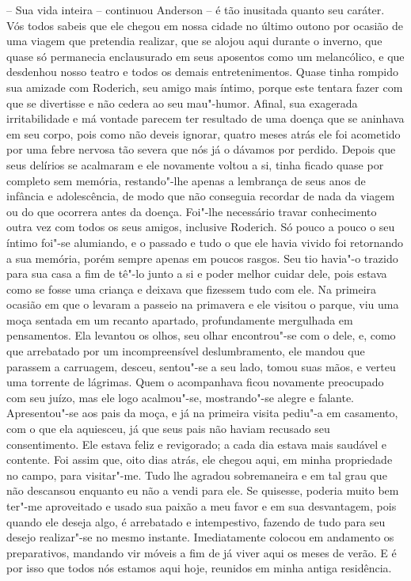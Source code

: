-- Sua vida inteira -- continuou Anderson -- é tão inusitada quanto seu
caráter. Vós todos sabeis que ele chegou em nossa cidade no último
outono por ocasião de uma viagem que pretendia realizar, que se alojou
aqui durante o inverno, que quase só permanecia enclausurado em seus
aposentos como um melancólico, e que desdenhou nosso teatro e todos os
demais entretenimentos. Quase tinha rompido sua amizade com Roderich,
seu amigo mais íntimo, porque este tentara fazer com que se divertisse
e não cedera ao seu mau"-humor. Afinal, sua exagerada irritabilidade e
má vontade parecem ter resultado de uma doença que se aninhava em seu corpo,
pois como não deveis ignorar, quatro meses atrás ele foi acometido
por uma febre nervosa tão severa que nós já o dávamos por perdido.
Depois que seus delírios se acalmaram e ele novamente voltou a si,
tinha ficado quase por completo sem memória, restando"-lhe apenas a
lembrança de seus anos de infância e adolescência, de modo que não
conseguia recordar de nada da viagem ou do que ocorrera antes da
doença. Foi"-lhe necessário travar conhecimento outra vez com todos os
seus amigos, inclusive Roderich. Só pouco a pouco o seu íntimo foi"-se
alumiando, e o passado e tudo o que ele havia vivido foi retornando a
sua memória, porém sempre apenas em poucos rasgos. Seu tio havia"-o
trazido para sua casa a fim de tê"-lo junto a si e poder melhor cuidar
dele, pois estava como se fosse uma criança e deixava que fizessem tudo
com ele. Na primeira ocasião em que o levaram a passeio na primavera e
ele visitou o parque, viu uma moça sentada em um recanto apartado,
profundamente mergulhada em pensamentos. Ela levantou os olhos, seu
olhar encontrou"-se com o dele, e, como que arrebatado por um
incompreensível deslumbramento, ele mandou que parassem a carruagem,
desceu, sentou"-se a seu lado, tomou suas mãos, e verteu uma torrente de
lágrimas. Quem o acompanhava ficou novamente preocupado com seu juízo,
mas ele logo acalmou"-se, mostrando"-se alegre e falante. Apresentou"-se
aos pais da moça, e já na primeira visita pediu"-a em casamento, com o
que ela aquiesceu, já que seus pais não haviam recusado seu
consentimento. Ele estava feliz e revigorado; a cada dia estava mais
saudável e contente. Foi assim que, oito dias atrás, ele chegou aqui,
em minha propriedade no campo, para visitar"-me. Tudo lhe agradou
sobremaneira e em tal grau que não descansou enquanto eu não a vendi
para ele. Se quisesse, poderia muito bem ter"-me aproveitado e usado sua
paixão a meu favor e em sua desvantagem, pois quando ele deseja algo, é
arrebatado e intempestivo, fazendo de tudo para seu desejo realizar"-se
no mesmo instante. Imediatamente colocou em andamento os preparativos,
mandando vir móveis a fim de já viver aqui os meses de verão. E é por
isso que todos nós estamos aqui hoje, reunidos em minha antiga residência.

